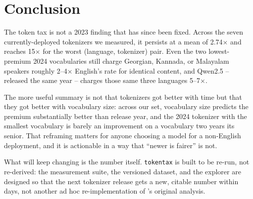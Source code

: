 \documentclass[11pt]{article}
\begin{document}
\section{Conclusion}

The token tax is not a 2023 finding that has since been fixed. Across the
seven currently-deployed tokenizers we measured, it persists at a mean of
2.74$\times$ and reaches 15$\times$ for the worst (language, tokenizer)
pair. Even the two lowest-premium 2024 vocabularies still charge Georgian,
Kannada, or Malayalam speakers roughly 2--4$\times$ English's rate for
identical content, and Qwen2.5 -- released the same year -- charges those
same three languages 5--7$\times$.

The more useful summary is not that tokenizers got better with time but
that they got better with vocabulary size: across our set, vocabulary size
predicts the premium substantially better than release year, and the 2024
tokenizer with the smallest vocabulary is barely an improvement on a
vocabulary two years its senior. That reframing matters for anyone choosing
a model for a non-English deployment, and it is actionable in a way that
``newer is fairer'' is not.

What will keep changing is the number itself. \texttt{tokentax} is built to
be re-run, not re-derived: the
measurement suite, the versioned dataset, and the explorer are designed so
that the next tokenizer release gets a new, citable number within days,
not another ad hoc re-implementation of \citeauthor{petrov2023}'s original
analysis.



\end{document}
